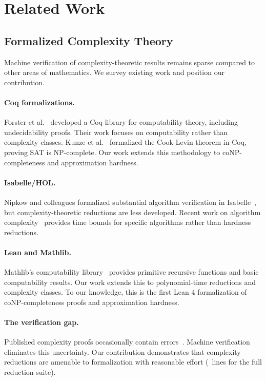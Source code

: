\section{Related Work}\label{sec:related}

\subsection{Formalized Complexity Theory}

Machine verification of complexity-theoretic results remains sparse compared to other areas of mathematics. We survey existing work and position our contribution.

\paragraph{Coq formalizations.} Forster et al.~\cite{forster2019verified} developed a Coq library for computability theory, including undecidability proofs. Their work focuses on computability rather than complexity classes. Kunze et al.~\cite{kunze2019formal} formalized the Cook-Levin theorem in Coq, proving SAT is NP-complete. Our work extends this methodology to coNP-completeness and approximation hardness.

\paragraph{Isabelle/HOL.} Nipkow and colleagues formalized substantial algorithm verification in Isabelle~\cite{nipkow2002isabelle}, but complexity-theoretic reductions are less developed. Recent work on algorithm complexity~\cite{haslbeck2021verified} provides time bounds for specific algorithms rather than hardness reductions.

\paragraph{Lean and Mathlib.} Mathlib's computability library~\cite{mathlib2020} provides primitive recursive functions and basic computability results. Our work extends this to polynomial-time reductions and complexity classes. To our knowledge, this is the first Lean 4 formalization of coNP-completeness proofs and approximation hardness.

\paragraph{The verification gap.} Published complexity proofs occasionally contain errors~\cite{lipton2009np}. Machine verification eliminates this uncertainty. Our contribution demonstrates that complexity reductions are amenable to formalization with reasonable effort (\LeanTotalLines\ lines for the full reduction suite).

